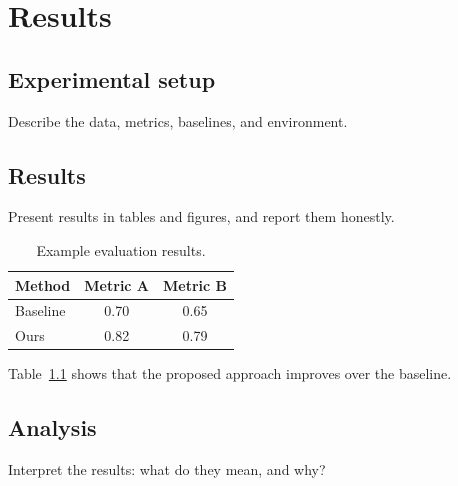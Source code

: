 \chapter{Results}
\label{ch:results}

\section{Experimental setup}
Describe the data, metrics, baselines, and environment.

\section{Results}
Present results in tables and figures, and report them honestly.

\begin{table}[htbp]
  \centering
  \caption{Example evaluation results.}
  \label{tab:results}
  \begin{tabular}{lcc}
    \toprule
    Method   & Metric A & Metric B \\
    \midrule
    Baseline & 0.70     & 0.65     \\
    Ours     & 0.82     & 0.79     \\
    \bottomrule
  \end{tabular}
\end{table}

Table~\ref{tab:results} shows that the proposed approach improves over the
baseline.

\section{Analysis}
Interpret the results: what do they mean, and why?
